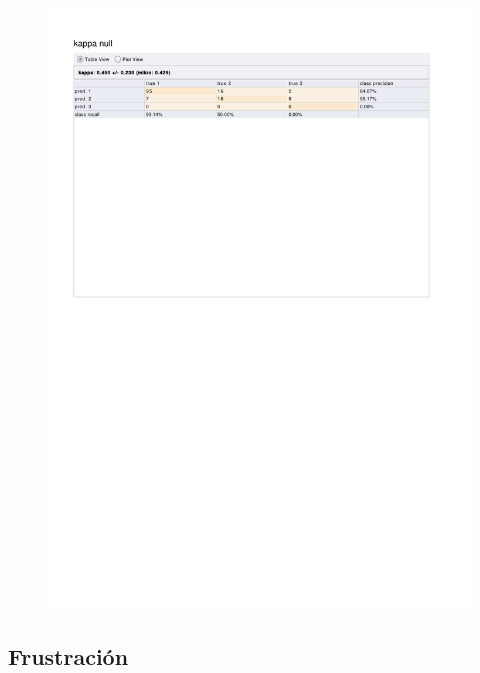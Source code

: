 \begin{figure}[htp]
  \centerline{\includegraphics[trim=0 680 0 80,clip,width=16.09cm]{results/ANN_K_Focus.pdf}} \caption{
} \label{ANN_K_Focus}
\end{figure}

\clearpage
\FloatBarrier
\subsection{Frustración}

